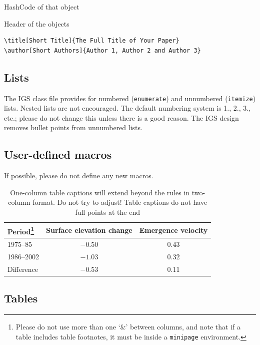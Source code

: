 \documentclass[aog]{igs}
\begin{document}
		    HashCode of that object

      Header of the objects
		    
		    

\begin{verbatim}
\title[Short Title]{The Full Title of Your Paper}
\author[Short Authors]{Author 1, Author 2 and Author 3}
\end{verbatim}

\subsection{Lists}
The IGS class file provides for numbered (\verb"enumerate") and unnumbered (\verb"itemize") lists. Nested lists are not encouraged. The default numbering system is 1., 2., 3., etc.; please do not change this unless there is a good reason. The IGS design removes bullet points from unnumbered lists.

\subsection{User-defined macros}
If possible, please do not define any new macros.

\begin{table}%
\caption{One-column table captions will extend beyond
  the rules in two-column format. Do not try to adjust!
  Table captions do not have full points at the end}
\label{period}
\begin{minipage}{86mm}%
\begin{tabular}{@{}lcc}\hline
Period\footnote{Please do not use more than one `\&' 
  between columns, and note that if a table includes 
  table footnotes, it must be inside a \texttt{minipage} 
  environment.}%
  & Surface elevation change
  & Emergence velocity\\ \hline
1975--85   & $-0.50$ & 0.43\\
1986--2002 & $-1.03$ & 0.32\\
Difference & $-0.53$ & \llap{$-$}0.11
\end{tabular}
\end{minipage}%
\end{table}

\subsection{Tables}
\end{document}
